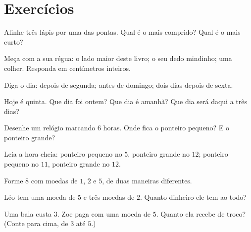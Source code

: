 \section{Exercícios}

\begin{exercise}[$\star$]\label{exo:g1:measure:1}
Alinhe três lápis por uma das pontas. Qual é o mais comprido? Qual é
o mais curto?
\end{exercise}

\begin{exercise}[$\star$]\label{exo:g1:measure:2}
Meça com a sua régua: o lado maior deste livro; o seu dedo mindinho;
uma colher. Responda em centímetros inteiros.
\end{exercise}

\begin{exercise}[$\star$]\label{exo:g1:measure:3}
Diga o dia: depois de segunda; antes de domingo; dois dias depois de
sexta.
\end{exercise}

\begin{exercise}[$\star$]\label{exo:g1:measure:4}
Hoje é quinta. Que dia foi ontem? Que dia é amanhã? Que dia será
daqui a três dias?
\end{exercise}

\begin{exercise}[$\star$]\label{exo:g1:measure:5}
Desenhe um relógio marcando $6$ horas. Onde fica o ponteiro pequeno?
E o ponteiro grande?
\end{exercise}

\begin{exercise}[$\star$]\label{exo:g1:measure:6}
Leia a hora cheia: ponteiro pequeno no $5$, ponteiro grande no $12$;
ponteiro pequeno no $11$, ponteiro grande no $12$.
\end{exercise}

\begin{exercise}[$\star$]\label{exo:g1:measure:7}
Forme $8$ com moedas de $1$, $2$ e $5$, de duas maneiras diferentes.
\end{exercise}

\begin{exercise}[$\star$]\label{exo:g1:measure:8}
Léo tem uma moeda de $5$ e três moedas de $2$. Quanto dinheiro ele
tem ao todo?
\end{exercise}

\begin{exercise}[$\star\star$]\label{exo:g1:measure:9}
Uma bala custa $3$. Zoe paga com uma moeda de $5$. Quanto ela recebe
de troco? (Conte para cima, de $3$ até $5$.)
\end{exercise}
